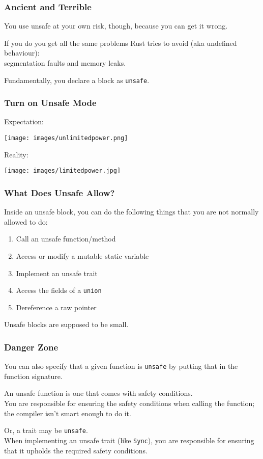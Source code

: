 \begin{frame}
\frametitle{Ancient and Terrible}

You use unsafe at your own risk, though, because you can get it wrong.

If you do you get all the same problems Rust tries to avoid (aka undefined behaviour):\\ 
\qquad segmentation faults and memory leaks.

Fundamentally, you declare a block as \texttt{unsafe}.

\end{frame}


\begin{frame}
\frametitle{Turn on Unsafe Mode}

Expectation:
\begin{center}
	\texttt{[image: images/unlimitedpower.png]}
\end{center}

Reality:
\begin{center}
	\texttt{[image: images/limitedpower.jpg]}
\end{center}

\end{frame}



\begin{frame}
\frametitle{What Does Unsafe Allow?}

Inside an unsafe block, you can do the following things that you are not normally allowed to do:

\begin{enumerate}
	\item Call an unsafe function/method
	\item Access or modify a mutable static variable
	\item Implement an unsafe trait
	\item Access the fields of a \texttt{union}
	\item Dereference a raw pointer
\end{enumerate}

Unsafe blocks are supposed to be small. 

\end{frame}


\begin{frame}[fragile]
\frametitle{Danger Zone}

You can also specify that a given function is \texttt{unsafe} by putting that in the function signature.

An unsafe function is one that comes with safety conditions.\\
\alert{You} are responsible for ensuring the safety conditions when calling the function; 
the compiler isn't smart enough to do it.

Or, a trait may be \texttt{unsafe}.\\
When implementing an unsafe trait (like \texttt{Sync}), \alert{you} are responsible for ensuring
that it upholds the required safety conditions.

\end{frame}

